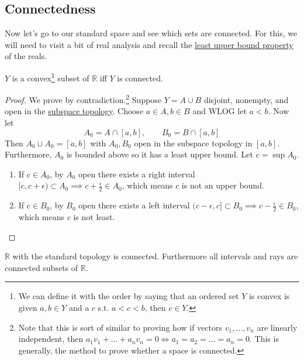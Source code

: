 \subsection{Connectedness} 

  Now let's go to our standard space and see which sets are connected. For this, we will need to visit a bit of real analysis and recall the \hyperref[alg-def:least-upper-bound-property]{least upper bound property} of the reals.  

  \begin{theorem}
    \label{thm:convex-subsets-of-reals-are-connected}
    $Y$ is a convex\footnote{We can define it with the order by saying that an ordered set $Y$ is convex is given $a, b \in Y$ and a $c$ s.t. $a < c < b$, then $c \in Y$.} subset of $\mathbb{R}$ iff $Y$ is connected. 
  \end{theorem}
  \begin{proof}
    We prove by contradiction.\footnote{Note that this is sort of similar to proving how if vectors $v_1, \ldots, v_n$ are linearly independent, then $a_1 v_1 + \ldots + a_n v_n = 0 \iff a_1 = a_2 = \ldots = a_n = 0$. This is generally, the method to prove whether a space is connected.} Suppose $Y = A \cup B$ disjoint, nonempty, and open in the \hyperref[def:subspace-topology]{subspace topology}. Choose $a \in A, b \in B$ and WLOG let $a < b$. Now let 
    \begin{equation}
      A_0 = A \cap [a, b], \qquad B_0 = B \cap [a, b]
    \end{equation}
    Then $A_0 \sqcup A_0 = [a, b]$ with $A_0, B_0$ open in the subspace topology in $[a, b]$. Furthermore, $A_0$ is bounded above so it has a least upper bound. Let $c = \sup{A_0}$. 
    \begin{enumerate}
      \item If $c \in A_0$, by $A_0$ open there exists a right interval $[c, c + \epsilon) \subset A_0 \implies c + \frac{\epsilon}{2} \in A_0$, which means $c$ is not an upper bound. 
      \item If $c \in B_0$, by $B_0$ open there exists a left interval $(c - \epsilon, c] \subset B_0 \implies c - \frac{\epsilon}{2} \in B_0 $, which means $c$ is not least. 
    \end{enumerate}
  \end{proof}

  \begin{corollary}
    \label{thm:connectedness-of-r-and-its-intervals}
    $\mathbb{R}$ with the standard topology is connected. Furthermore all intervals and rays are connected subsets of $\mathbb{R}$. 
  \end{corollary} 

